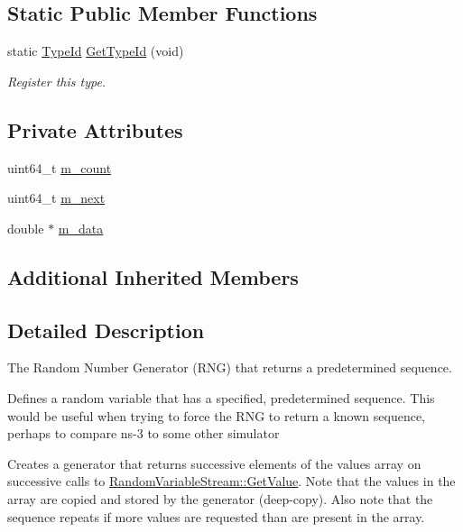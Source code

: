\subsection*{Static Public Member Functions}
\begin{DoxyCompactItemize}
\item 
static \hyperlink{classns3_1_1TypeId}{Type\+Id} \hyperlink{classns3_1_1DeterministicRandomVariable_a9c3a6e21db27126fba82dad5cd0fd70e}{Get\+Type\+Id} (void)
\begin{DoxyCompactList}\small\item\em Register this type. \end{DoxyCompactList}\end{DoxyCompactItemize}
\subsection*{Private Attributes}
\begin{DoxyCompactItemize}
\item 
uint64\+\_\+t \hyperlink{classns3_1_1DeterministicRandomVariable_a12fcc72ca7ca0cf15902dfbba0ad22b1}{m\+\_\+count}
\item 
uint64\+\_\+t \hyperlink{classns3_1_1DeterministicRandomVariable_adbde3840cf467ef47e7f992a60889370}{m\+\_\+next}
\item 
double $\ast$ \hyperlink{classns3_1_1DeterministicRandomVariable_ace75f5e6ad8dede93af88662d0009d99}{m\+\_\+data}
\end{DoxyCompactItemize}
\subsection*{Additional Inherited Members}


\subsection{Detailed Description}
The Random Number Generator (R\+NG) that returns a predetermined sequence. 

Defines a random variable that has a specified, predetermined sequence. This would be useful when trying to force the R\+NG to return a known sequence, perhaps to compare ns-\/3 to some other simulator

Creates a generator that returns successive elements of the values array on successive calls to \hyperlink{classns3_1_1RandomVariableStream_a4fa5944dc4cb11544e661ed23072b36c}{Random\+Variable\+Stream\+::\+Get\+Value}. Note that the values in the array are copied and stored by the generator (deep-\/copy). Also note that the sequence repeats if more values are requested than are present in the array.

